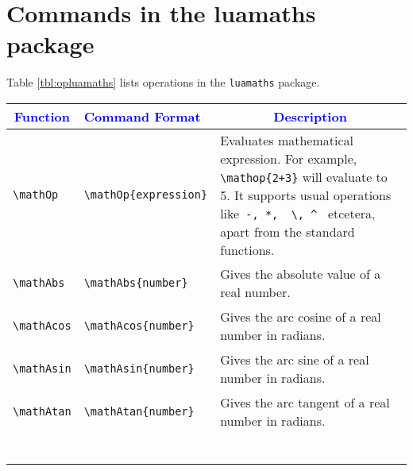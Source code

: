 \documentclass{article}
\begin{document}
\section{Commands in the luamaths package}
Table \ref{tbl:opluamaths} lists operations in the \verb|luamaths| package.
\begin{center}
\begin{longtable}{llm{6.5cm}}
\toprule
\multicolumn{1}{c}{\textcolor{blue}{Function}} & \multicolumn{1}{l}{\textcolor{blue}{Command Format}} & \multicolumn{1}{c}{\textcolor{blue}{Description}}  \\
\toprule
\begin{lstlisting}
\mathOp
\end{lstlisting} &
\begin{lstlisting}
\mathOp{expression}
\end{lstlisting} & Evaluates mathematical expression. For example, \lstinline|\mathop{2+3}| will evaluate to 5. It supports usual operations like\lstinline| -, *,  \, ^ | etcetera, apart from the standard functions. \\
\midrule
\begin{lstlisting}
\mathAbs
\end{lstlisting} &
\begin{lstlisting}
\mathAbs{number}
\end{lstlisting} & Gives the absolute value of a real number.\\
\midrule
\begin{lstlisting}
\mathAcos
\end{lstlisting} &
\begin{lstlisting}
\mathAcos{number}
\end{lstlisting} & Gives the arc cosine of a real number in radians.\\
\midrule
\begin{lstlisting}
\mathAsin
\end{lstlisting} &
\begin{lstlisting}
\mathAsin{number}
\end{lstlisting} & Gives the arc sine of a real number in radians.\\
\midrule
\begin{lstlisting}
\mathAtan
\end{lstlisting} &
\begin{lstlisting}
\mathAtan{number}
\end{lstlisting} & Gives the arc tangent of a real number in radians.\\
\midrule
\begin{lstlisting}

\end{lstlisting}
\end{longtable}
\end{center}
\end{document}
